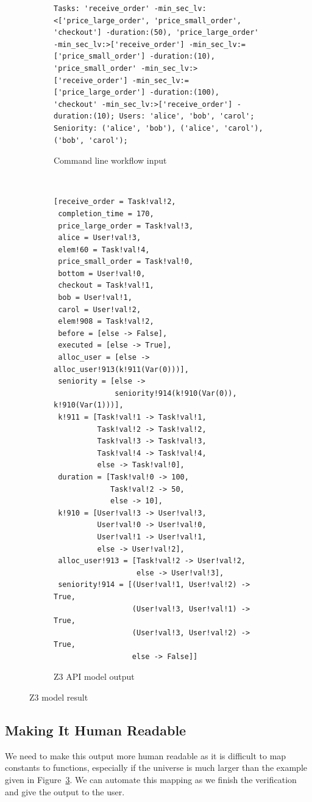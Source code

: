 \documentclass[a4paper]{report}
\begin{document}
\begin{figure}[!h]
\centering
\begin{subfigure}[b]{\textwidth}
\begin{lstlisting}[frame=single]
Tasks: 'receive_order' -min_sec_lv:<['price_large_order', 'price_small_order', 'checkout'] -duration:(50), 'price_large_order' -min_sec_lv:>['receive_order'] -min_sec_lv:=['price_small_order'] -duration:(10), 'price_small_order' -min_sec_lv:>['receive_order'] -min_sec_lv:=['price_large_order'] -duration:(100), 'checkout' -min_sec_lv:>['receive_order'] -duration:(10); Users: 'alice', 'bob', 'carol'; Seniority: ('alice', 'bob'), ('alice', 'carol'), ('bob', 'carol');
\end{lstlisting}
\caption{Command line workflow input}
\label{fig:Command line worflow input}
\end{subfigure} \\
\begin{subfigure}[b]{\textwidth}
\begin{lstlisting}[frame=single]
[receive_order = Task!val!2,
 completion_time = 170,
 price_large_order = Task!val!3,
 alice = User!val!3,
 elem!60 = Task!val!4,
 price_small_order = Task!val!0,
 bottom = User!val!0,
 checkout = Task!val!1,
 bob = User!val!1,
 carol = User!val!2,
 elem!908 = Task!val!2,
 before = [else -> False],
 executed = [else -> True],
 alloc_user = [else -> alloc_user!913(k!911(Var(0)))],
 seniority = [else ->
              seniority!914(k!910(Var(0)), k!910(Var(1)))],
 k!911 = [Task!val!1 -> Task!val!1,
          Task!val!2 -> Task!val!2,
          Task!val!3 -> Task!val!3,
          Task!val!4 -> Task!val!4,
          else -> Task!val!0],
 duration = [Task!val!0 -> 100,
             Task!val!2 -> 50,
             else -> 10],
 k!910 = [User!val!3 -> User!val!3,
          User!val!0 -> User!val!0,
          User!val!1 -> User!val!1,
          else -> User!val!2],
 alloc_user!913 = [Task!val!2 -> User!val!2,
                   else -> User!val!3],
 seniority!914 = [(User!val!1, User!val!2) -> True,
                  (User!val!3, User!val!1) -> True,
                  (User!val!3, User!val!2) -> True,
                  else -> False]]
\end{lstlisting}
\caption{Z3 API model output}
\label{fig:Z3 API model output}
\end{subfigure}
\caption{Z3 model result}
\label{fig:Z3 model result}
\end{figure}

\subsection{Making It Human Readable}
We need to make this output more human readable as it is difficult to map constants to functions, especially if the universe is much larger than the example given in Figure~\ref{fig:Z3 model result}. We can automate this mapping as we finish the verification and give the output to the user. 
\end{document}

